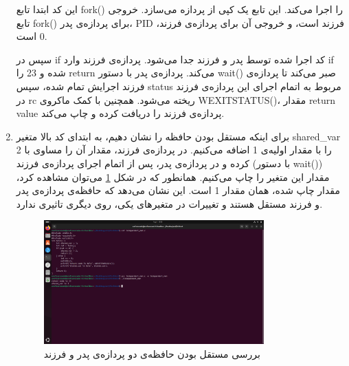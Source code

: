 \documentclass[12pt]{article}
\begin{document}
\begin{enumerate}
        این کد ابتدا تابع
        \textenglish{fork()}
        را اجرا می‌کند. این تابع یک کپی از پردازه می‌سازد. خروجی تابع
        \textenglish{fork()}
        برای پردازه‌ی پدر،
        \textenglish{PID}
        فرزند است، و خروجی آن برای پردازه‌ی فرزند،
        \textenglish{0}
        است.

        سپس در 
        \textenglish{if}
        کد اجرا شده توسط پدر و فرزند جدا می‌شود. پردازه‌ی فرزند وارد
        \textenglish{if}
        شده و 
        \textenglish{23}
        را 
        \textenglish{return}
        می‌کند. پردازه‌ی پدر با دستور
        \textenglish{wait()}
        صبر می‌کند تا پردازه‌ی فرزند اجرایش تمام شده، سپس 
        \textenglish{status}
        مربوط به اتمام اجرای این پردازه‌ی فرزند در
        \textenglish{rc}
        ریخته می‌شود. همچنین با کمک ماکروی
        \textenglish{WEXITSTATUS()}،
        مقدار
        \textenglish{return value}
        پردازه‌ی فرزند را دریافت کرده و چاپ می‌کند.

        \item 
        برای اینکه مستقل بودن حافظه را نشان دهیم، به ابتدای کد بالا متغیر
        \textenglish{shared\_var}
        را با مقدار اولیه‌ی 
        \textenglish{1}
        اضافه می‌کنیم. در پردازه‌ی فرزند، مقدار آن را مساوی با 
        \textenglish{2}
        کرده و در پردازه‌ی پدر، پس از اتمام اجرای پردازه‌ی فرزند (با دستور
        \textenglish{wait()})
        مقدار این متغیر را چاپ می‌کنیم. همانطور که در شکل 
        \ref{im6}
        می‌توان مشاهده کرد، مقدار چاپ شده، همان مقدار 
        \textenglish{1}
        است. این نشان می‌دهد که  حافظه‌ی پردازه‌ی پدر و فرزند مستقل هستند و تغییرات در متغیرهای یکی، روی دیگری تاثیری ندارد.

        \begin{figure}[H]
		\centering
		\includegraphics[width=0.8\textwidth]{report4-resources/6.png}
		\caption{بررسی مستقل بودن حافظه‌ی دو پردازه‌ی پدر و فرزند}
            \label{im6}
	\end{figure}


\end{enumerate}
\end{document}
